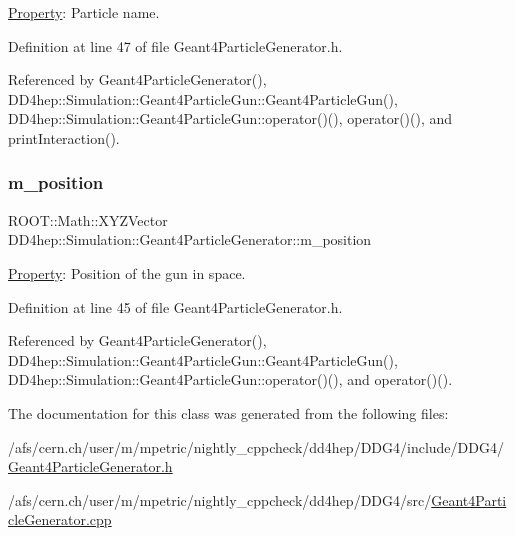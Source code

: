 \hyperlink{class_d_d4hep_1_1_property}{Property}\+: Particle name. 



Definition at line 47 of file Geant4\+Particle\+Generator.\+h.



Referenced by Geant4\+Particle\+Generator(), D\+D4hep\+::\+Simulation\+::\+Geant4\+Particle\+Gun\+::\+Geant4\+Particle\+Gun(), D\+D4hep\+::\+Simulation\+::\+Geant4\+Particle\+Gun\+::operator()(), operator()(), and print\+Interaction().

\hypertarget{class_d_d4hep_1_1_simulation_1_1_geant4_particle_generator_a6ee07c5b63244214bb70499dd66eb26a}{}\label{class_d_d4hep_1_1_simulation_1_1_geant4_particle_generator_a6ee07c5b63244214bb70499dd66eb26a} 
\subsubsection{\texorpdfstring{m\+\_\+position}{m\_position}}
{\footnotesize\ttfamily R\+O\+O\+T\+::\+Math\+::\+X\+Y\+Z\+Vector D\+D4hep\+::\+Simulation\+::\+Geant4\+Particle\+Generator\+::m\+\_\+position\hspace{0.3cm}{\ttfamily [protected]}}



\hyperlink{class_d_d4hep_1_1_property}{Property}\+: Position of the gun in space. 



Definition at line 45 of file Geant4\+Particle\+Generator.\+h.



Referenced by Geant4\+Particle\+Generator(), D\+D4hep\+::\+Simulation\+::\+Geant4\+Particle\+Gun\+::\+Geant4\+Particle\+Gun(), D\+D4hep\+::\+Simulation\+::\+Geant4\+Particle\+Gun\+::operator()(), and operator()().



The documentation for this class was generated from the following files\+:\begin{DoxyCompactItemize}
\item 
/afs/cern.\+ch/user/m/mpetric/nightly\+\_\+cppcheck/dd4hep/\+D\+D\+G4/include/\+D\+D\+G4/\hyperlink{_geant4_particle_generator_8h}{Geant4\+Particle\+Generator.\+h}\item 
/afs/cern.\+ch/user/m/mpetric/nightly\+\_\+cppcheck/dd4hep/\+D\+D\+G4/src/\hyperlink{_geant4_particle_generator_8cpp}{Geant4\+Particle\+Generator.\+cpp}\end{DoxyCompactItemize}
